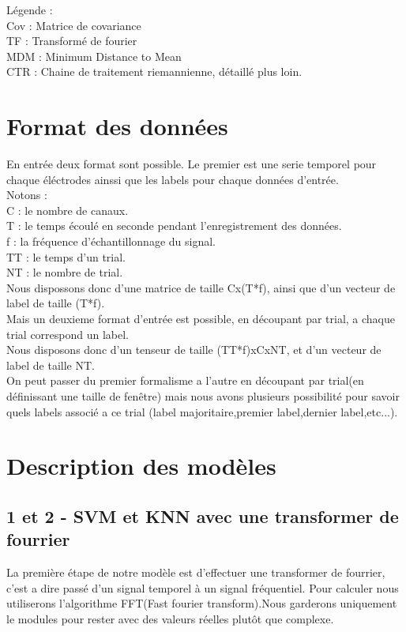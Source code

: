 \documentclass{article}[12pt]
\begin{document}
Légende :\\
Cov : Matrice de covariance\\
TF : Transformé de fourier\\
MDM : Minimum Distance to Mean\\
CTR : Chaine de traitement riemannienne, détaillé plus loin.
\\

\section{Format des données}
En entrée deux format sont possible. Le premier est une serie temporel pour chaque éléctrodes ainssi que les labels pour chaque données d'entrée.\\
Notons :\\
C : le nombre de canaux.\\
T : le temps écoulé en seconde pendant l'enregistrement des données.\\
f : la fréquence d’échantillonnage du signal.\\
TT : le temps d'un trial.\\
NT : le nombre de trial.\\
Nous dispossons donc d'une matrice de taille Cx(T*f), ainsi que d'un vecteur de label de taille (T*f).\\
Mais un deuxieme format d'entrée est possible, en découpant par trial, a chaque trial correspond un label.\\

Nous disposons donc d'un tenseur de taille (TT*f)xCxNT, et d'un vecteur de label de taille NT.\\
On peut passer du premier formalisme a l'autre en découpant par trial(en définissant une taille de fenêtre) mais nous avons plusieurs possibilité pour savoir quels labels associé a ce trial (label majoritaire,premier label,dernier label,etc...).\\
\section{Description des modèles}
\subsection{1 et 2 - SVM et KNN avec une transformer de fourrier}
La première étape de notre modèle est d'effectuer une transformer de fourrier, c'est a dire passé d'un signal temporel à un signal fréquentiel. Pour calculer nous utiliserons l'algorithme FFT(Fast fourier transform).Nous garderons uniquement le modules pour rester avec des valeurs réelles plutôt que complexe.\\
\end{document}
